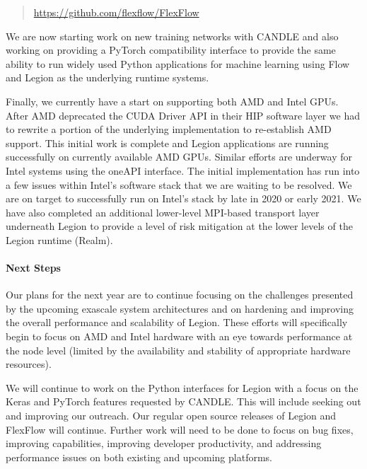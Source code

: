 \begin{quote} 
  \url{https://github.com/flexflow/FlexFlow} 
\end{quote}

We are now starting work on new training networks with CANDLE and also
working on providing a PyTorch compatibility interface to provide the same
ability to run widely used Python applications for machine learning using
Flow and Legion as the underlying runtime systems. 

Finally, we currently have a start on supporting both AMD and Intel
GPUs.  After AMD deprecated the CUDA Driver API in their HIP software
layer we had to rewrite a portion of the underlying implementation to
re-establish AMD support.  This initial work is complete and Legion
applications are running successfully on currently available AMD GPUs.
Similar efforts are underway for Intel systems using the oneAPI
interface.  The initial implementation has run into a few issues
within Intel's software stack that we are waiting to be resolved.  We
are on target to successfully run on Intel's stack by late in 2020 or
early 2021.  We have also completed an additional lower-level
MPI-based transport layer underneath Legion to provide a level of risk
mitigation at the lower levels of the Legion runtime (Realm).

\paragraph{Next Steps}

Our plans for the next year are to continue focusing on the challenges
presented by the upcoming exascale system architectures and on
hardening and improving the overall performance and scalability of
Legion.  These efforts will specifically begin to focus on AMD and
Intel hardware with an eye towards performance at the node level
(limited by the availability and stability of appropriate hardware
resources).

We will continue to work on the Python interfaces for Legion with a
focus on the Keras and PyTorch features requested by CANDLE.  This
will include seeking out and improving our outreach.  Our regular open
source releases of Legion and FlexFlow will continue.  Further work will
need to be done to focus on bug fixes, improving capabilities, improving
developer productivity, and addressing performance issues on both existing
and upcoming platforms.



